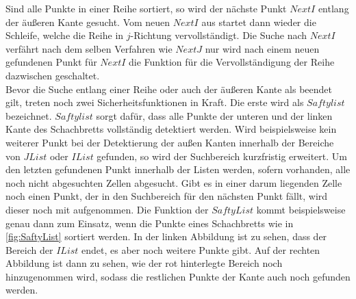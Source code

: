 Sind alle Punkte in einer Reihe sortiert, so wird der nächste Punkt $NextI$ entlang der äußeren Kante gesucht. Vom neuen $NextI$ aus startet dann wieder die Schleife, welche die Reihe in $j$-Richtung vervollständigt. Die Suche nach $NextI$ verfährt nach dem selben Verfahren wie $NextJ$ nur wird nach einem neuen gefundenen Punkt für $NextI$ die Funktion für die Vervollständigung der Reihe dazwischen geschaltet.\\

Bevor die Suche entlang einer Reihe oder auch der äußeren Kante als beendet gilt, treten noch zwei Sicherheitsfunktionen in Kraft. Die erste wird als $Saftylist$ bezeichnet. $Saftylist$ sorgt dafür, dass alle Punkte der unteren und der linken Kante des Schachbretts vollständig detektiert werden. Wird beispielsweise kein weiterer Punkt bei der Detektierung der außen Kanten innerhalb der Bereiche von $JList$ oder $IList$ gefunden, so wird der Suchbereich kurzfristig erweitert. Um den letzten gefundenen Punkt innerhalb der Listen werden, sofern vorhanden, alle noch nicht abgesuchten Zellen abgesucht. Gibt es in einer darum liegenden Zelle noch einen Punkt, der in den Suchbereich für den nächsten Punkt fällt, wird dieser noch mit aufgenommen. Die Funktion der $SaftyList$ kommt beispielsweise genau dann zum Einsatz, wenn die Punkte eines Schachbretts wie in \ref{fig:SaftyList} sortiert werden. In der linken Abbildung ist zu sehen, dass der Bereich der $IList$ endet, es aber noch weitere Punkte gibt. Auf der rechten Abbildung ist dann zu sehen, wie der rot hinterlegte Bereich noch hinzugenommen wird, sodass die restlichen Punkte der Kante auch noch gefunden werden.\\


